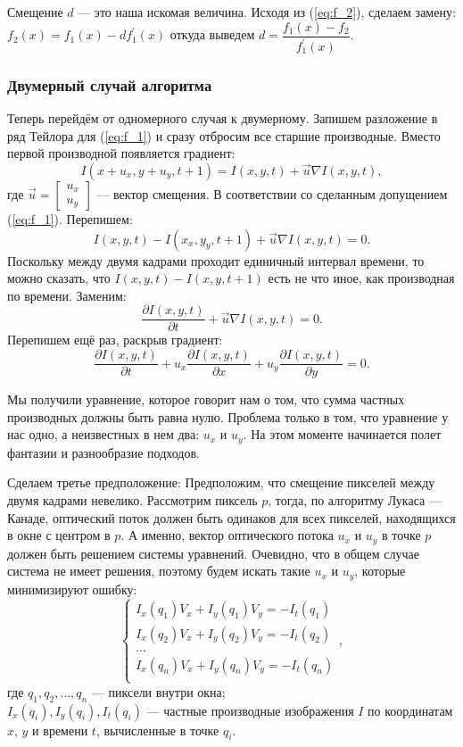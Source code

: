 Смещение $d$ — это наша искомая величина. Исходя из (\ref{eq:f_2}), сделаем замену:$f_2(x)=f_1(x)-df_1^{'}(x)$
откуда выведем $d = \dfrac{f_1(x)-f_2}{f_1^{'}(x)}.$
\subsubsection{Двумерный случай алгоритма}

Теперь перейдём от одномерного случая к двумерному. Запишем разложение в ряд Тейлора для (\ref{eq:f_1}) и сразу отбросим все старшие производные. Вместо первой производной появляется градиент:
$$I(x+u_x,y+u_y,t+1)=I(x,y,t)+\overrightarrow{u} \nabla I(x,y,t),$$
где $\overrightarrow{u} = \begin{bmatrix}
u_x\\
u_y
\end{bmatrix} $ — вектор смещения.
В соответствии со сделанным допущением (\ref{eq:f_1}). Перепишем:
$$I(x,y,t)-I(x_x,y_y,t+1) + \overrightarrow{u} \nabla I(x,y,t) = 0.$$
Поскольку между двумя кадрами проходит единичный интервал времени, то можно сказать, что $I(x,y,t)-I(x,y,t+1)$ есть не что иное, как производная по времени.
Заменим:
$$\frac{\partial I(x,y,t)}{\partial t} + \overrightarrow{u} \nabla I(x,y,t) = 0.$$
Перепишем ещё раз, раскрыв градиент:
$$\frac{\partial I(x,y,t)}{\partial t} + u_x\frac{\partial I(x,y,t)}{\partial x} + u_y\frac{\partial I(x,y,t)}{\partial y} = 0.$$

Мы получили уравнение, которое говорит нам о том, что сумма частных производных должны быть равна нулю. Проблема только в том, что уравнение у нас одно, а неизвестных в нем два: $u_x$ и $u_y$. На этом моменте начинается полет фантазии и разнообразие подходов.

Сделаем третье предположение: Предположим, что смещение пикселей между двумя кадрами невелико. Рассмотрим пиксель $p$, тогда, по алгоритму Лукаса — Канаде, оптический поток должен быть одинаков для всех пикселей, находящихся в окне с центром в $p$. А именно, вектор оптического потока $u_x$ и $u_y$ в точке $p$ должен быть решением системы уравнений. Очевидно, что в общем случае система не имеет решения, поэтому будем искать такие $u_x$ и $u_y$, которые минимизируют ошибку:
$$
\begin{cases}
I_x(q_1) V_x + I_y (q_1) V_y = -I_t(q_1)\\
I_x(q_2) V_x + I_y (q_2) V_y = -I_t(q_2)\\
...\\
I_x(q_n) V_x + I_y (q_n) V_y = -I_t(q_n)\\
\end{cases},
$$
где $q_1,q_2,\dots,q_n$ — пиксели внутри окна;\\
$I_x(q_i),I_y(q_i),I_t(q_i)$ — частные производные изображения $I$ по координатам $x$, $y$ и времени $t$, вычисленные в точке $q_i$.

